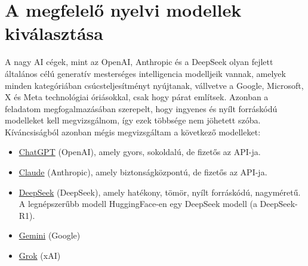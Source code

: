\documentclass[12pt]{report}
\theoremstyle{definition}
\begin{document}
\section{A megfelelő nyelvi modellek kiválasztása}
A nagy AI cégek, mint az OpenAI, Anthropic és a DeepSeek olyan fejlett általános célú generatív mesterséges intelligencia modelljeik vannak, amelyek minden kategóriában csúcsteljesítményt nyújtanak, vállvetve a Google, Microsoft, X és Meta technológiai óriásokkal, csak hogy párat említsek. Azonban a feladatom megfogalmazásában szerepelt, hogy ingyenes és nyílt forráskódú modelleket kell megvizsgálnom, így ezek többsége nem jöhetett szóba. Kíváncsiságból azonban mégis megvizsgáltam a következő modelleket:

\begin{itemize}
\item \href{https://chatgpt.com}{ChatGPT} (OpenAI), amely gyors, sokoldalú, de fizetős az API-ja.
\item \href{https://claude.ai}{Claude} (Anthropic), amely biztonságközpontú, de fizetős az API-ja.
\item \href{https://chat.deepseek.com}{DeepSeek} (DeepSeek), amely hatékony, tömör, nyílt forráskódú, nagyméretű. A legnépszerűbb modell HuggingFace-en egy DeepSeek modell (a DeepSeek-R1).
\item \href{https://gemini.google.com}{Gemini} (Google)
\item \href{https://grok.x.com}{Grok} (xAI)
\end{itemize}

\begin{table}[h]
\centering
{}
\caption{Nagy nyelvi modellek teljesítményértékelése. Az 5600 kérdés a 2800 egyenes, valamint 2800 fordított sorrendben beadott kérdésből álló prompt-korpusz egyenes és fordított beadásából tevődik össze.}
\end{table}
\end{document}
